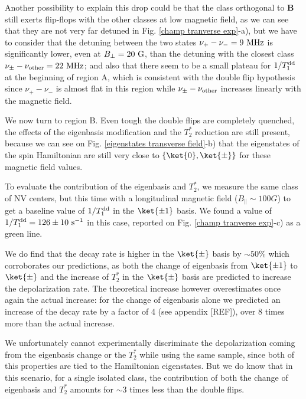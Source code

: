 \documentclass[a4paper,11pt]{report}
\begin{document}
Another possibility to explain this drop could be that the class orthogonal to $\mathbf{B}$ still exerts flip-flops with the other classes at low magnetic field, as we can see that they are not very far detuned in Fig. \ref{champ tranverse exp}-a), but we have to consider that the detuning between the two states $\nu_+-\nu_-= 9\ \rm MHz$ is significantly lower, even at $B_\perp=20\ \rm G$, than the detuning with the closest class $\nu_\pm-\nu_{\rm other}= 22\ \rm MHz$; and also that there seem to be a small plateau for $1/T_1^{\rm dd}$ at the beginning of region A, which is consistent with the double flip hypothesis since  $\nu_+-\nu_-$ is almost flat in this region while $\nu_\pm-\nu_{\rm other}$ increases linearly with the magnetic field.

We now turn to region B. Even tough the double flips are completely quenched, the effects of the eigenbasis modification and the $T_2^*$ reduction are still present, because we can see on Fig. \ref{eigenstates transverse field}-b) that the eigenstates of the spin Hamiltonian are still very close to $\{ \ket{0}, \ket{\pm} \}$ for these magnetic field values.

To evaluate the contribution of the eigenbasis and $T_2^*$, we measure the same class of NV centers, but this time with a longitudinal magnetic field ($B_\parallel \sim 100 G$) to get a baseline value of $1/T_1^{\rm dd}$ in the $\ket{\pm 1}$ basis. We found a value of $1/T_1^{\rm dd}=126 \pm 10\ \rm s^{-1}$ in this case, reported on Fig. \ref{champ tranverse exp}-c) as a green line. 

We do find that the decay rate is higher in the $\ket{\pm}$ basis by $\sim 50\% $ which corroborates our predictions, as both the change of eigenbasis from $\ket{\pm 1}$ to $\ket{\pm}$ and the increase of $T_2^*$ in the $\ket{\pm}$ basis are predicted to increase the depolarization rate. The theoretical increase however overestimates once again the actual increase: for the change of eigenbasis alone we predicted an increase of the decay rate by a factor of 4 (see appendix [REF]), over 8 times more than the actual increase.

We unfortunately cannot experimentally discriminate the depolarization coming from the eigenbasis change or the $T_2^*$ while using the same sample, since both of this properties are tied to the Hamiltonian eigenstates. But we do know that in this scenario, for a single isolated class, the contribution of both the change of eigenbasis and $T_2^*$ amounts for $\sim 3$ times less than the double flips. 
\end{document}
